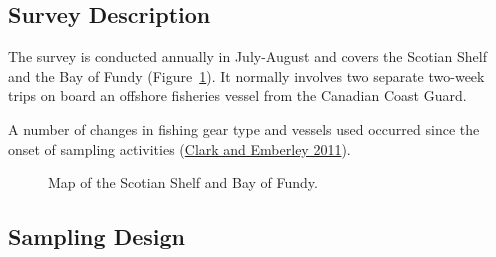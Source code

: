 \documentclass[12pt]{article}\usepackage[]{graphicx}\usepackage[]{color}
\begin{document}
\hypertarget{survey-description}{%
\subsection{Survey Description}\label{survey-description}}

The survey is conducted annually in July-August and covers the Scotian Shelf and the Bay of Fundy (Figure~\ref{fig:map1}). It normally involves two separate two-week trips on board an offshore fisheries vessel from the Canadian Coast Guard.

A number of changes in fishing gear type and vessels used occurred since the onset of sampling activities (\protect\hyperlink{ref-ClarkEmberley2011}{Clark and Emberley 2011}).


\begin{figure}[htb]

{\centering {} 

}

\caption{Map of the Scotian Shelf and Bay of Fundy.}\label{fig:map1}
\end{figure}
\hypertarget{sampling-design}{%
\subsection{Sampling Design}\label{sampling-design}}
\end{document}

